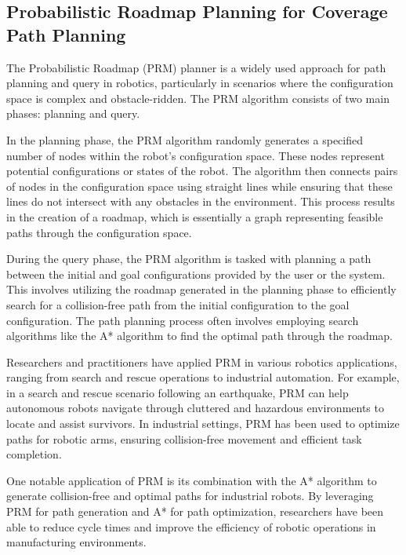\subsection{Probabilistic Roadmap Planning for Coverage Path Planning}

The Probabilistic Roadmap (PRM) planner is a widely used approach for path planning and query in robotics, particularly in scenarios where the configuration space is complex and obstacle-ridden. The PRM algorithm consists of two main phases: planning and query.

\vspace*{6mm}

In the planning phase, the PRM algorithm randomly generates a specified number of nodes within the robot's configuration space. These nodes represent potential configurations or states of the robot. The algorithm then connects pairs of nodes in the configuration space using straight lines while ensuring that these lines do not intersect with any obstacles in the environment. This process results in the creation of a roadmap, which is essentially a graph representing feasible paths through the configuration space.

\vspace*{6mm}

During the query phase, the PRM algorithm is tasked with planning a path between the initial and goal configurations provided by the user or the system. This involves utilizing the roadmap generated in the planning phase to efficiently search for a collision-free path from the initial configuration to the goal configuration. The path planning process often involves employing search algorithms like the A* algorithm to find the optimal path through the roadmap.

\vspace*{6mm}

Researchers and practitioners have applied PRM in various robotics applications, ranging from search and rescue operations to industrial automation. For example, in a search and rescue scenario following an earthquake, PRM can help autonomous robots navigate through cluttered and hazardous environments to locate and assist survivors. In industrial settings, PRM has been used to optimize paths for robotic arms, ensuring collision-free movement and efficient task completion.

\vspace*{6mm}

One notable application of PRM is its combination with the A* algorithm to generate collision-free and optimal paths for industrial robots. By leveraging PRM for path generation and A* for path optimization, researchers have been able to reduce cycle times and improve the efficiency of robotic operations in manufacturing environments.

